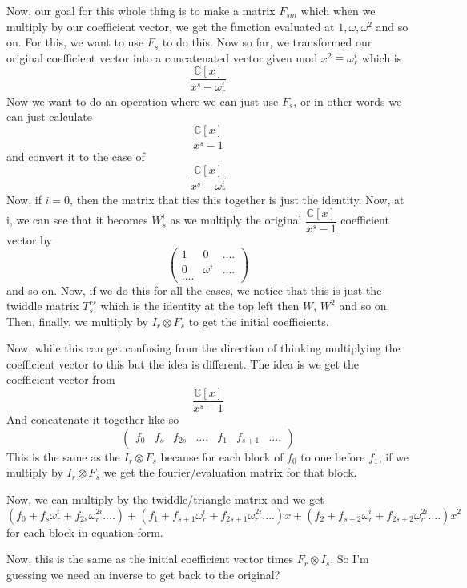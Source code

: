 \documentclass{article}
\begin{document}
	Now, our goal for this whole thing is to make a matrix $F_{sm}$ which when we multiply by our coefficient vector, we get the function evaluated at $1, \omega, \omega^2$ and so on. For this, we want to use $F_s$ to do this. Now so far, we transformed our original coefficient vector into a concatenated vector given mod $x^2 \equiv \omega_r^i$ which is
	\begin{equation}
		\dfrac{\mathbb{C}[x]}{x^{s}-\omega_r^i}
	\end{equation}
	Now we want to do an operation where we can just use $F_s$, or in other words we can just calculate
	\begin{equation}
		\dfrac{\mathbb{C}[x]}{x^{s}-1}
	\end{equation}
	and convert it to the case of
	\begin{equation}
		\dfrac{\mathbb{C}[x]}{x^{s}-\omega_r^i}
	\end{equation}
	Now, if $i=0$, then the matrix that ties this together is just the identity. Now, at i, we can see that it becomes $W_s^i$ as we multiply the original $\dfrac{\mathbb{C}[x]}{x^{s}-1}$ coefficient vector by
	\begin{equation}
		\begin{pmatrix}
			1 & 0 & .... \\
			0 & \omega^i & .... \\
			....
		\end{pmatrix}
	\end{equation}
	and so on. Now, if we do this for all the cases, we notice that this is just the twiddle matrix $T^{rs}_s$ which is the identity at the top left then $W$, $W^2$ and so on.
	Then, finally, we multiply by $I_r \otimes F_s$ to get the initial coefficients.
	
	
	Now, while this can get confusing from the direction of thinking multiplying the coefficient vector to this but the idea is different. The idea is we get the coefficient vector from
	\begin{equation}
		\dfrac{\mathbb{C}[x]}{x^{s}-1}
	\end{equation}
	And concatenate it together like so
	\begin{equation}
		\begin{pmatrix}
			f_0 & f_s & f_{2s} & .... & f_1 & f_{s+1} & ....
		\end{pmatrix}
	\end{equation}
	This is the same as the $I_r \otimes F_s$ because for each block of $f_0$ to one before $f_1$, if we multiply by $I_r \otimes F_s$ we get the fourier/evaluation matrix for that block.
	
	Now, we can multiply by the twiddle/triangle matrix and we get
	\begin{equation}
		(f_0+f_s\omega_r^i+f_{2s}\omega_r^{2i}....) + (f_1+f_{s+1}\omega_r^i+f_{2s+1}\omega_r^{2i}....)x +
		(f_2+f_{s+2}\omega_r^i+f_{2s+2}\omega_r^{2i}....)x^2
	\end{equation}
	for each block in equation form.
	
	Now, this is the same as the initial coefficient vector times $F_r \otimes I_s$. So I'm guessing we need an inverse to get back to the original?
\end{document}
